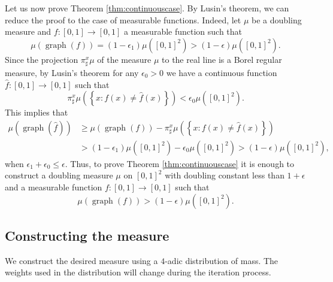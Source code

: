 \documentclass[reqno,12pt]{amsart}
\theoremstyle{plain}
\theoremstyle{remark}
\begin{document}
Let us now prove Theorem \ref{thm:continuouscase}.
By Lusin's theorem, we can reduce the proof to the case of measurable functions. 
Indeed, 
let $\mu$ be a doubling measure and $f \colon [0,1] \to [0,1]$ a measurable function
such that 
\[
 \mu(\operatorname{graph}(f)) =  (1 - \epsilon_1)\mu([0,1]^2) > (1 - \epsilon)\mu([0,1]^2).
\] 
Since the projection $\pi^x_{\sharp}\mu$ of the measure $\mu$ to the real line is a Borel regular 
measure, by Lusin's theorem 
for any $\epsilon_0>0$ we have a continuous function $\hat{f} \colon [0,1] \to [0,1]$ such that 
\[
 \pi^x_{\sharp}\mu (\left\{ x: f(x) \neq \hat{f}(x) \right\})< \epsilon_0 \mu([0,1]^2). 
\]
This implies that
\begin{align*}
\mu(\operatorname{graph}(\hat{f})) & \geq \mu(\operatorname{graph}(f)) - \pi^x_{\sharp}\mu (\left\{ x: f(x) \neq \hat{f}(x) \right\})\\
& >  (1 - \epsilon_1)\mu([0,1]^2) - \epsilon_0 \mu([0,1]^2) >  (1 - \epsilon)\mu([0,1]^2),  
\end{align*}
when $\epsilon_1 + \epsilon_0 \leq \epsilon$.
Thus, to prove Theorem \ref{thm:continuouscase} it is enough to construct 
a doubling measure $\mu$ on $[0,1]^2$ with 
 doubling constant less than $1+\epsilon$
 and a measurable function $f \colon [0,1] \to [0,1]$ such that
 \begin{equation}\label{eq:largemeasure}
  \mu(\operatorname{graph}(f)) > (1-\epsilon)\mu([0,1]^2).  
 \end{equation}

\subsection{Constructing the measure}

  We construct the desired measure using a $4$-adic distribution of mass. 
  The weights used in the distribution will change during the iteration process. 
  
\end{document}

